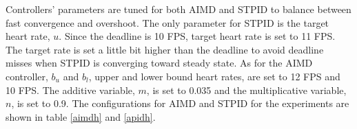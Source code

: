 Controllers' parameters are tuned for both AIMD and STPID to balance between fast convergence and overshoot. The only parameter for STPID is the target heart rate, $u$. Since the deadline is 10 FPS, target heart rate is set to 11 FPS. The target rate is set a little bit higher than the deadline to avoid deadline misses when STPID is converging toward steady state. As for the AIMD controller, $b_u$ and $b_l$, upper and lower bound heart rates, are set to 12 FPS and 10 FPS. The additive variable, $m$, is set to 0.035 and the multiplicative variable, $n$, is set to 0.9. The configurations for AIMD and STPID for the experiments are shown in table \ref{aimdh} and \ref{apidh}.



